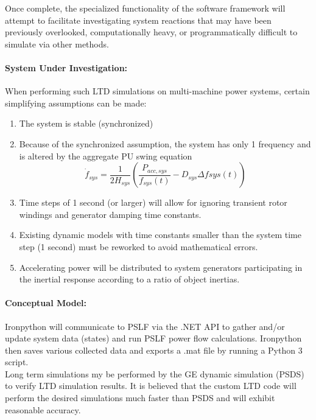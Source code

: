 \documentclass[12pt]{article}
\begin{document}
Once complete, the specialized functionality of the software framework will attempt to facilitate investigating system reactions that may have been previously overlooked, computationally heavy, or programmatically difficult to simulate via other methods.
\paragraph{System Under Investigation:}
When performing such LTD simulations on multi-machine power systems, certain simplifying assumptions can be made:
\begin{enumerate}
	\item The system is stable (synchronized)
	\item Because of the synchronized assumption, the system has only 1 frequency and is altered by the aggregate PU swing equation
	\[ \dot{f}_{sys} = \dfrac{1}{2H_{sys} } \left( \dfrac{P_{acc, sys} }{f_{sys}(t)} - D_{sys}\Delta f{sys}(t)  \right)  \]
	\item Time steps of 1 second (or larger) will allow for ignoring transient rotor windings and generator damping time constants. 
	\item Existing dynamic models with time constants smaller than the system time step (1 second) must be reworked to avoid mathematical errors.
	\item Accelerating power will be distributed to system generators participating in the inertial response according to a ratio of object inertias.
\end{enumerate}

\pagebreak
\paragraph{Conceptual Model:}
Ironpython will communicate to PSLF via the .NET API to gather and/or update system data (states) and run PSLF power flow calculations. Ironpython then saves various collected data and exports a .mat file by running a Python 3 script.\\

Long term simulations my be performed by the GE dynamic simulation (PSDS) to verify LTD simulation results. It is believed that the custom LTD code will perform the desired simulations much faster than PSDS and will exhibit reasonable accuracy. 
\end{document}
